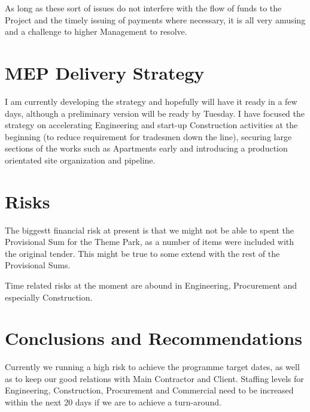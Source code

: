 As long as these sort of issues do not interfere with the flow of funds to the Project and the timely issuing of payments where necessary, it is all very amusing and a challenge to higher Management to resolve. 

\section*{MEP Delivery Strategy}

I am currently developing the strategy and hopefully will have it ready in a few days, although a preliminary version will be ready by Tuesday. I have focused the strategy on accelerating Engineering and start-up Construction activities at the beginning (to reduce requirement for tradesmen down the line), securing large sections of the works such as Apartments early and introducing a production orientated site organization and pipeline. 

\section*{Risks}

The biggestt financial risk at present is that we might not be able to spent the Provisional Sum for the Theme Park, as a number of items were included with the original tender. This might be true to some extend with the rest of the Provisional Sums.

Time related risks at the moment are abound in Engineering, Procurement and especially Construction.

\section*{Conclusions and Recommendations}

Currently we running a high risk to achieve the programme target dates, as well as to keep our good relations with Main Contractor and Client. Staffing levels for Engineering, Construction, Procurement and Commercial need to be increased within the next 20 days if we are to achieve a turn-around.




\endinput

One of the largest
obstacles in detailing MEP services for hotels, is the integration and co-ordination of the MEP requirements with the requirements dictated by the Interior Design. Both RCP and ID layouts at the Shop Drawing level need to be available to detail final MEP requirements. 

